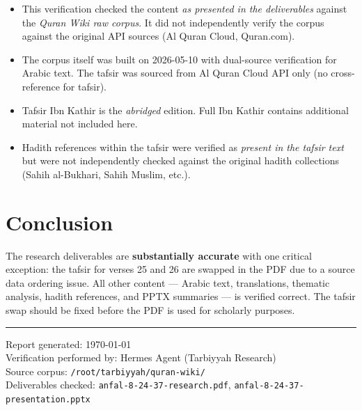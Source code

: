\documentclass[11pt,a4paper]{article}
\begin{document}
\begin{itemize}
\item This verification checked the content \textit{as presented in the deliverables} against the \textit{Quran Wiki raw corpus}. It did not independently verify the corpus against the original API sources (Al Quran Cloud, Quran.com).
\item The corpus itself was built on 2026-05-10 with dual-source verification for Arabic text. The tafsir was sourced from Al Quran Cloud API only (no cross-reference for tafsir).
\item Tafsir Ibn Kathir is the \textit{abridged} edition. Full Ibn Kathir contains additional material not included here.
\item Hadith references within the tafsir were verified as \textit{present in the tafsir text} but were not independently checked against the original hadith collections (Sahih al-Bukhari, Sahih Muslim, etc.).
\end{itemize}

\section*{Conclusion}

The research deliverables are \textbf{substantially accurate} with one critical exception: the tafsir for verses 25 and 26 are swapped in the PDF due to a source data ordering issue. All other content --- Arabic text, translations, thematic analysis, hadith references, and PPTX summaries --- is verified correct. The tafsir swap should be fixed before the PDF is used for scholarly purposes.

\vspace{1cm}
\hrule
\vspace{0.3cm}
\noindent\small\color{textmuted}
Report generated: \today\\
Verification performed by: Hermes Agent (Tarbiyyah Research)\\
Source corpus: \texttt{/root/tarbiyyah/quran-wiki/}\\
Deliverables checked: \texttt{anfal-8-24-37-research.pdf}, \texttt{anfal-8-24-37-presentation.pptx}
\end{document}
